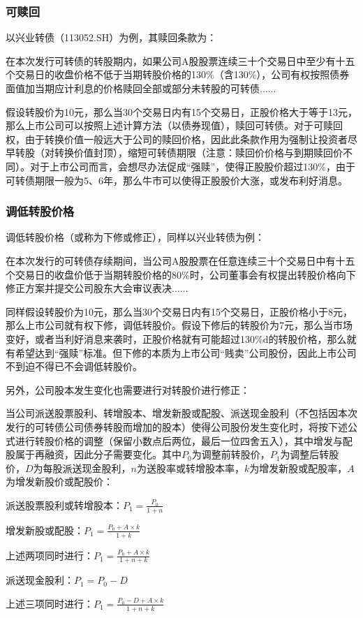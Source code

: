 \documentclass[11pt]{article}
\begin{document}
\subsubsection*{可赎回}

以兴业转债（113052.SH）为例，其赎回条款为：
\begin{example}
    在本次发行可转债的转股期内，如果公司A股股票连续三十个交易日中至少有十五个交易日的收盘价格不低于当期转股价格的130\%（含130\%），公司有权按照债券面值加当期应计利息的价格赎回全部或部分未转股的可转债......
\end{example}

假设转股价为10元，那么当30个交易日内有15个交易日，正股价格大于等于13元，那么上市公司可以按照上述计算方法（以债券现值），赎回可转债。对于可赎回权，由于转换价值一般远大于公司的赎回价格，因此此条款作用为强制让投资者尽早转股（对转换价值封顶），缩短可转债期限（注意：赎回价价格与到期赎回价不同）。对于上市公司而言，会想尽办法促成“强赎”，使得正股股价超过130\%，由于可转债期限一般为5、6年，那么牛市可以使得正股股价大涨，或发布利好消息。

\subsubsection*{调低转股价格}

调低转股价格（或称为下修或修正），同样以兴业转债为例：
\begin{example}
    在本次发行的可转债存续期间，当公司A股股票在任意连续三十个交易日中有十五个交易日的收盘价低于当期转股价格的80\%时，公司董事会有权提出转股价格向下修正方案并提交公司股东大会审议表决......
\end{example}

同样假设转股价为10元，那么当30个交易日内有15个交易日，正股价格小于8元，那么上市公司就有权下修，调低转股价。假设下修后的转股价为7元，那么当市场变好，或者当利好消息来袭时，正股价格就有可能超过130\%d的转股价格，那么就有希望达到“强赎”标准。但下修的本质为上市公司“贱卖”公司股份，因此上市公司不到迫不得已不会调低转股价。

另外，公司股本发生变化也需要进行对转股价进行修正：
\begin{example}
    当公司派送股票股利、转增股本、增发新股或配股、派送现金股利（不包括因本次发行的可转债公司债券转股而增加的股本）使得公司股份发生变化时，将按下述公式进行转股价格的调整（保留小数点后两位，最后一位四舍五入），其中增发与配股属于再融资，因此分子需要变化。其中$P_0$为调整前转股价，$P_1$为调整后转股价，$D$为每股派送现金股利，$n$为送股率或转增股本率，$k$为增发新股或配股率，$A$为增发新股价或配股价：

    派送股票股利或转增股本：$P_1 = \frac{P_0}{1+n}$

    增发新股或配股：$P_1 = \frac{P_0 + A\times k}{1+k}$

    上述两项同时进行：$P_1 = \frac{P_0 + A\times k}{1+n+k}$

    派送现金股利：$P_1 = P_0 - D$

    上述三项同时进行：$P_1 = \frac{P_0 - D + A\times k}{1+n+k}$
\end{example}
\end{document}
